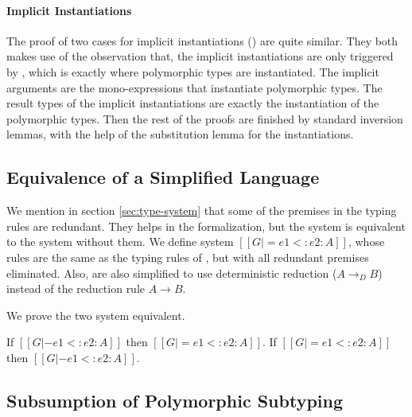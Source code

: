 
\paragraph{Implicit Instantiations}
The proof of two cases for implicit instantiations ()
are quite similar. They both makes use of the observation that, the implicit
instantiations are only triggered by , which is exactly where
polymorphic types are instantiated. The implicit arguments are the
mono-expressions that instantiate polymorphic types. The result types of the
implicit instantiations are exactly the instantiation of the polymorphic types.
Then the rest of the proofs are finished by standard inversion lemmas,
with the help of the substitution lemma for the instantiations.

\subsection{Equivalence of a Simplified Language}

We mention in section \ref{sec:type-system} that some of the premises in the
typing rules are redundant. They helps in the formalization, but the system
is equivalent to the system without them. We define system
$[[G |= e1 <: e2 : A]]$, whose rules are the same as the typing rules of \name
, but with all redundant premises eliminated. Also, 
are also simplified to use deterministic reduction ($A \longrightarrow_D B$)
instead of the reduction rule $A \longrightarrow B$.

We prove the two system equivalent.

\begin{theorem}
  If $[[G |- e1 <: e2 : A]]$ then $[[G |= e1 <: e2 : A]]$.
  If $[[G |= e1 <: e2 : A]]$ then $[[G |- e1 <: e2 : A]]$.
\end{theorem}

\subsection{Subsumption of Polymorphic Subtyping}

